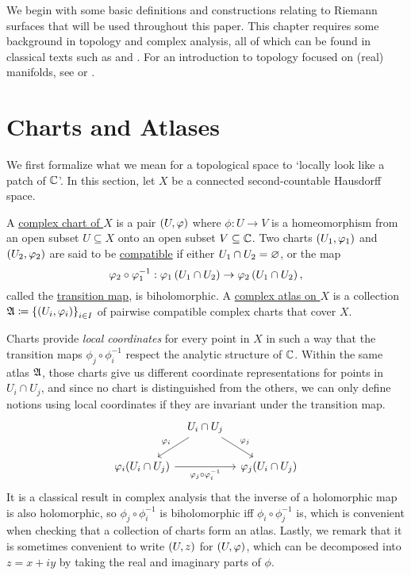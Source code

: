 \documentclass[../Moduli_Spaces_of_Riemann_Surfaces.tex]{subfiles}
\begin{document}
    We begin with some basic definitions and constructions relating to Riemann surfaces that will be used throughout this paper. This chapter requires some background in topology and complex analysis, all of which can be found in classical texts such as \cite{munkres} and \cite{lang}. For an introduction to topology focused on (real) manifolds, see \cite{leeTM} or \cite{tu}.
    \section{Charts and Atlases}\label{sec:charts_and_atlases}
    We first formalize what we mean for a topological space to `locally look like a patch of $\C$'. In this section, let $X$ be a connected second-countable Hausdorff space.
    \begin{definition}
        A \ul{complex chart of $X$} is a pair $\tpl{U,\phi}$ where $\phi:U\to V$ is a homeomorphism from an open subset $U\subseteq X$ onto an open subset $V\subseteq\C$. Two charts $\l(U_1,\phi_1\r)$ and $\l(U_2,\phi_2\r)$ are said to be \ul{compatible} if either $U_1\cap U_2=\em$, or the map
        \begin{equation*}
            \phi_2\circ\phi_1^{-1}:\phi_1\l(U_1\cap U_2\r)\to\phi_2\l(U_1\cap U_2\r),
        \end{equation*}
        called the \ul{transition map}, is biholomorphic. A \ul{complex atlas on $X$} is a collection $\mf{A}\coloneqq\l\{\l(U_i,\phi_i\r)\r\}_{i\in I}$ of pairwise compatible complex charts that cover $X$.
    \end{definition}
    \begin{remark}
        Charts provide \textit{local coordinates} for every point in $X$ in such a way that the transition maps $\phi_j\circ\phi_i^{-1}$ respect the analytic structure of $\C$. Within the same atlas $\mf{A}$, those charts give us different coordinate representations for points in $U_i\cap U_j$, and since no chart is distinguished from the others, we can only define notions using local coordinates if they are invariant under the transition map.
        \begin{equation*}
            \begin{tikzcd}[column sep=0.1in]
                & U_i\cap U_j \ar[dl, "\phi_i"'] \ar[dr, "\phi_j"] \\
                \phi_i(U_i\cap U_j) \ar[rr, "\phi_j\circ\phi_i^{-1}"'] & & \phi_j(U_i\cap U_j)
            \end{tikzcd}
        \end{equation*}
        It is a classical result in complex analysis that the inverse of a holomorphic map is also holomorphic, so $\phi_j\circ\phi_i^{-1}$ is biholomorphic iff $\phi_i\circ\phi_j^{-1}$ is, which is convenient when checking that a collection of charts form an atlas. Lastly, we remark that it is sometimes convenient to write $\tpl{U,z}$ for $\tpl{U,\phi}$, which can be decomposed into $z=x+iy$ by taking the real and imaginary parts of $\phi$.\exqed
    \end{remark}
\end{document}
